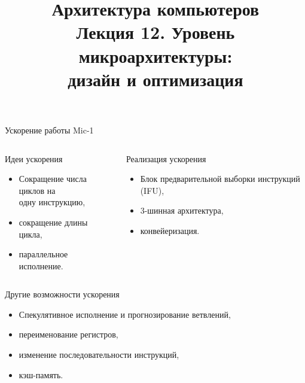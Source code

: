 \newcommand{\h}{%
handout,%
}




\title[Уровень микроархитектуры (2)]{Архитектура компьютеров\texorpdfstring{\\}{ }Лекция 12. Уровень микроархитектуры:\texorpdfstring{\\}{ }
дизайн и оптимизация}



\begin{frame}
\titlepage
\end{frame}



\begin{frame}{Ускорение работы Mic-1}
\begin{columns}
    \column{6cm}
\pause
\begin{block}{Идеи ускорения}
\begin{itemize}[<+->]
    \item Сокращение числа циклов на\\
        одну инструкцию,
    \item сокращение длины цикла,
    \item параллельное исполнение.
\end{itemize}
\end{block}

\pause
    \column{5.5cm}
\begin{block}{Реализация ускорения}
\begin{itemize}%
    \item Блок предварительной выборки инструкций (IFU),
    \item 3-шинная архитектура,
    \item конвейеризация.
\end{itemize}
\end{block}
\end{columns}

\pause
\begin{block}{Другие возможности ускорения}
\begin{itemize}[<+->]
    \item Спекулятивное исполнение и прогнозирование ветвлений,
    \item переименование регистров,
    \item изменение последовательности инструкций,
    \item кэш-память.
\end{itemize}
\end{block}
\end{frame}

